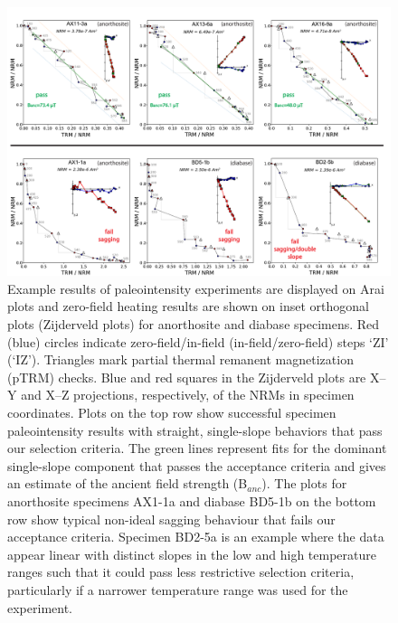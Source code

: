 \documentclass[9pt,twocolumn,twoside,lineno]{pnas-new}
\begin{document}
\begin{figure}
\noindent\includegraphics[width=17.8cm]{IZZI_examples.pdf}
\centering
\caption{\footnotesize{Example results of paleointensity experiments are displayed on Arai plots and zero-field heating results are shown on inset orthogonal plots (Zijderveld plots) for anorthosite and diabase specimens. Red (blue) circles indicate zero-field/in-field (in-field/zero-field) steps `ZI’ (`IZ’). Triangles mark partial thermal remanent magnetization (pTRM) checks. Blue and red squares in the Zijderveld plots are X–Y and X–Z projections, respectively, of the NRMs in specimen coordinates. Plots on the top row show successful specimen paleointensity results with straight, single-slope behaviors that pass our selection criteria. The green lines represent fits for the dominant single-slope component that passes the acceptance criteria and gives an estimate of the ancient field strength (B$_{anc}$). The plots for anorthosite specimens AX1-1a and diabase BD5-1b on the bottom row show typical non-ideal sagging behaviour that fails our acceptance criteria. Specimen BD2-5a is an example where the data appear linear with distinct slopes in the low and high temperature ranges such that it could pass less restrictive selection criteria, particularly if a narrower temperature range was used for the experiment.}}
\label{fig:IZZI_examples}
\end{figure}
\end{document}
